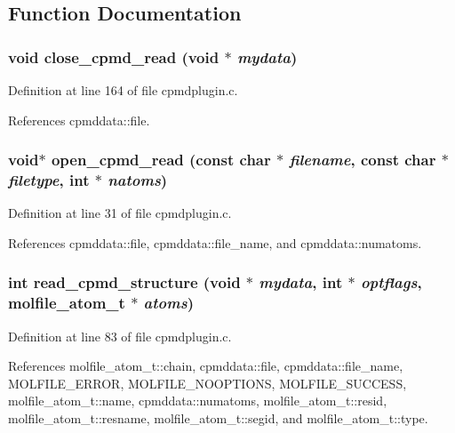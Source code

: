 \subsection{Function Documentation}
\subsubsection{\setlength{\rightskip}{0pt plus 5cm}void close\_\-cpmd\_\-read (void $\ast$ {\em mydata})\hspace{0.3cm}{\tt  [static]}}\label{cpmdplugin_8c_a4}




Definition at line 164 of file cpmdplugin.c.

References cpmddata::file.
\subsubsection{\setlength{\rightskip}{0pt plus 5cm}void$\ast$ open\_\-cpmd\_\-read (const char $\ast$ {\em filename}, const char $\ast$ {\em filetype}, int $\ast$ {\em natoms})\hspace{0.3cm}{\tt  [static]}}\label{cpmdplugin_8c_a1}




Definition at line 31 of file cpmdplugin.c.

References cpmddata::file, cpmddata::file\_\-name, and cpmddata::numatoms.
\subsubsection{\setlength{\rightskip}{0pt plus 5cm}int read\_\-cpmd\_\-structure (void $\ast$ {\em mydata}, int $\ast$ {\em optflags}, {\bf molfile\_\-atom\_\-t} $\ast$ {\em atoms})\hspace{0.3cm}{\tt  [static]}}\label{cpmdplugin_8c_a2}




Definition at line 83 of file cpmdplugin.c.

References molfile\_\-atom\_\-t::chain, cpmddata::file, cpmddata::file\_\-name, MOLFILE\_\-ERROR, MOLFILE\_\-NOOPTIONS, MOLFILE\_\-SUCCESS, molfile\_\-atom\_\-t::name, cpmddata::numatoms, molfile\_\-atom\_\-t::resid, molfile\_\-atom\_\-t::resname, molfile\_\-atom\_\-t::segid, and molfile\_\-atom\_\-t::type.
